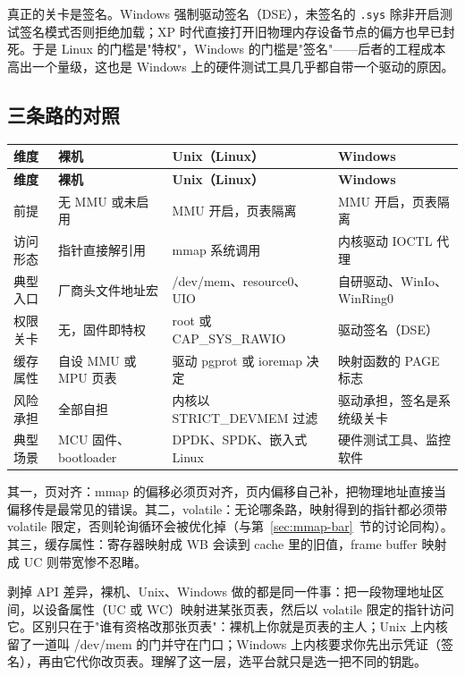 \documentclass[12pt,a4paper,fontset=fandol]{ctexbook}
\begin{document}
真正的关卡是签名。Windows 强制驱动签名（DSE），未签名的 \texttt{.sys} 除非开启测试签名模式否则拒绝加载；XP 时代直接打开旧物理内存设备节点的偏方也早已封死。于是 Linux 的门槛是"特权"，Windows 的门槛是"签名"——后者的工程成本高出一个量级，这也是 Windows 上的硬件测试工具几乎都自带一个驱动的原因。

\subsection{三条路的对照}

\begin{longtable}{>{\raggedright\arraybackslash}p{2.4cm}>{\raggedright\arraybackslash}p{3.9cm}>{\raggedright\arraybackslash}p{4.0cm}>{\raggedright\arraybackslash}p{4.0cm}}
\toprule
\textbf{维度} & \textbf{裸机} & \textbf{Unix（Linux）} & \textbf{Windows} \\
\midrule
\endfirsthead
\toprule
\textbf{维度} & \textbf{裸机} & \textbf{Unix（Linux）} & \textbf{Windows} \\
\midrule
\endhead
前提 & 无 MMU 或未启用 & MMU 开启，页表隔离 & MMU 开启，页表隔离 \\
访问形态 & 指针直接解引用 & mmap 系统调用 & 内核驱动 IOCTL 代理 \\
典型入口 & 厂商头文件地址宏 & /dev/mem、resource0、UIO & 自研驱动、WinIo、WinRing0 \\
权限关卡 & 无，固件即特权 & root 或 CAP\_SYS\_RAWIO & 驱动签名（DSE） \\
缓存属性 & 自设 MMU 或 MPU 页表 & 驱动 pgprot 或 ioremap 决定 & 映射函数的 PAGE 标志 \\
风险承担 & 全部自担 & 内核以 STRICT\_DEVMEM 过滤 & 驱动承担，签名是系统级关卡 \\
典型场景 & MCU 固件、bootloader & DPDK、SPDK、嵌入式 Linux & 硬件测试工具、监控软件 \\
\bottomrule
\end{longtable}

\begin{tcolorbox}[warning={三条路共通的三个坑}]
其一，页对齐：mmap 的偏移必须页对齐，页内偏移自己补，把物理地址直接当偏移传是最常见的错误。其二，volatile：无论哪条路，映射得到的指针都必须带 volatile 限定，否则轮询循环会被优化掉（与第~\ref{sec:mmap-bar}~节的讨论同构）。其三，缓存属性：寄存器映射成 WB 会读到 cache 里的旧值，frame buffer 映射成 UC 则带宽惨不忍睹。
\end{tcolorbox}

\begin{tcolorbox}[guideline={三条路最终汇合到同一件事}]
剥掉 API 差异，裸机、Unix、Windows 做的都是同一件事：把一段物理地址区间，以设备属性（UC 或 WC）映射进某张页表，然后以 volatile 限定的指针访问它。区别只在于"谁有资格改那张页表"：裸机上你就是页表的主人；Unix 上内核留了一道叫 /dev/mem 的门并守在门口；Windows 上内核要求你先出示凭证（签名），再由它代你改页表。理解了这一层，选平台就只是选一把不同的钥匙。
\end{tcolorbox}
\end{document}
